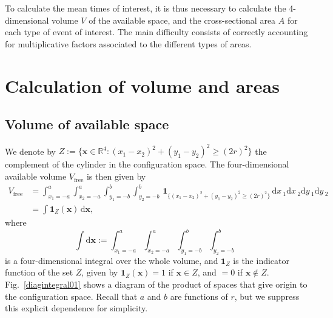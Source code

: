 \documentclass[superscriptaddress,pre,reprint,showpacs,onecolumn]{revtex4-1}
\newcommand{\rd}[1]{\mathrm{d}{#1} \,}
\newcommand{\indicatorsymbol}{\mathbf{1}}
\newcommand{\indicator}[1]{\indicatorsymbol_{ \{   #1 \} } }
\begin{document}

To calculate the mean times of interest, it is thus necessary to calculate
the 4-dimensional volume $V$ of the available space, and the cross-sectional area $A$ 
for each type of event of interest. The main difficulty consists of correctly accounting for multiplicative factors associated to the different 
types of areas.
%
%


\section{Calculation of volume and areas}


\subsection{Volume of available space}


We denote by $Z := \{ \mathbf{x} \in \mathbb{R}^4: (x_1-x_2)^2 + (y_1-y_2)^2 \ge (2r)^2 \}$ 
the complement of the cylinder in the configuration space.
The four-dimensional available volume $V_\text{free}$ is then given by
\begin{align}\label{volindic}
V_\text{free} &= 
\int_{x_1 = -a}^a  \int_{x_2 = -a}^a  \int_{y_1 = -b}^b \int_{y_2 = -b}^b
 \, \indicator{ (x_1-x_2)^2 + (y_1-y_2)^2 \ge (2r)^2 } \,
\rd x_1 \rd x_2 \rd y_1 \rd y_2 \\
&=
\int \indicatorsymbol_Z(\mathbf{x}) \, \mathrm{d} \mathbf{x},
\end{align}
where
$$ \int  \mathrm{d} \mathbf{x} :=  \int_{x_1 = -a}^a  \int_{x_2 = -a}^a  \int_{y_1 = -b}^b \int_{y_2 = -b}^b$$
is a four-dimensional integral over the whole volume, and 
$\indicatorsymbol_Z$ is the indicator function of the set $Z$, 
given by $\indicatorsymbol_Z (\mathbf{x}) = 1$ if $\mathbf{x} \in Z$, and $=0$ if $\mathbf{x} \notin Z$.
Fig.~\ref{diagintegral01} shows a diagram of the product of
spaces that give origin to the configuration space.
Recall that $a$ and $b$ are functions of $r$, 
but we suppress this explicit dependence for simplicity.
\end{document}
